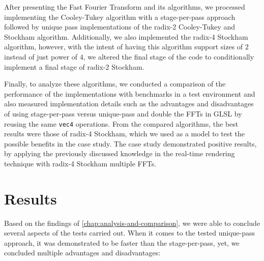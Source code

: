 \documentclass[
  oneside,
  11pt, a4paper,
  footinclude=true,
  headinclude=true,
  cleardoublepage=empty
]{scrbook}
\begin{document}
After presenting the Fast Fourier Transform and its algorithms, we processed implementing the Cooley-Tukey algorithm with a stage-per-pass approach followed by unique pass implementations of the radix-2 Cooley-Tukey and Stockham algorithm. Additionally, we also implemented the radix-4 Stockham algorithm, however, with the intent of having this algorithm support sizes of $2$ instead of just power of $4$, we altered the final stage of the code to conditionally implement a final stage of radix-2 Stockham.

Finally, to analyze these algorithms, we conducted a comparison of the performance of the implementations with benchmarks in a test environment and also measured implementation details such as the advantages and disadvantages of using stage-per-pass versus unique-pass and double the FFTs in GLSL by reusing the same \texttt{vec4} operations. From the compared algorithms, the best results were those of radix-4 Stockham, which we used as a model to test the possible benefits in the case study. The case study demonstrated positive results, by applying the previously discussed knowledge in the real-time rendering technique with radix-4 Stockham multiple FFTs.

\section{Results}


Based on the findings of \autoref{chap:analysis-and-comparison}, we were able to conclude several aspects of the tests carried out. When it comes to the tested unique-pass approach, it was demonstrated to be faster than the stage-per-pass, yet, we concluded multiple advantages and disadvantages:
\newline
\end{document}
